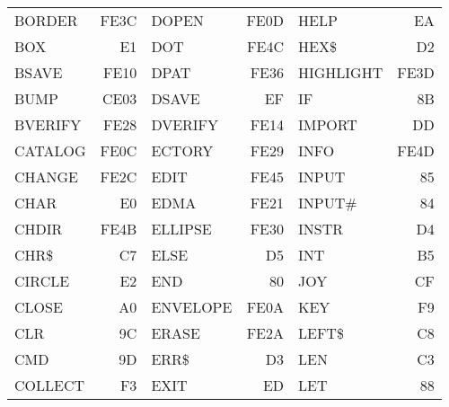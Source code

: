 {\begin{center}
\begin{tabular}{|p{2.2cm}r|p{2.2cm}r|p{2.2cm}r|}
BORDER     & FE3C & DOPEN      & FE0D & HELP       &   EA \\
BOX        &   E1 & DOT        & FE4C & HEX\$      &   D2 \\
BSAVE      & FE10 & DPAT       & FE36 & HIGHLIGHT  & FE3D \\
BUMP       & CE03 & DSAVE      &   EF & IF         &   8B \\
BVERIFY    & FE28 & DVERIFY    & FE14 & IMPORT     &   DD \\
CATALOG    & FE0C & ECTORY     & FE29 & INFO       & FE4D \\
CHANGE     & FE2C & EDIT       & FE45 & INPUT      &   85 \\
CHAR       &   E0 & EDMA       & FE21 & INPUT\#    &   84 \\
CHDIR      & FE4B & ELLIPSE    & FE30 & INSTR      &   D4 \\
CHR\$      &   C7 & ELSE       &   D5 & INT        &   B5 \\
CIRCLE     &   E2 & END        &   80 & JOY        &   CF \\
CLOSE      &   A0 & ENVELOPE   & FE0A & KEY        &   F9 \\
CLR        &   9C & ERASE      & FE2A & LEFT\$     &   C8 \\
CMD        &   9D & ERR\$      &   D3 & LEN        &   C3 \\
COLLECT    &   F3 & EXIT       &   ED & LET        &   88 \\
\hline
\end{tabular}
\end{center}
}
\newpage
